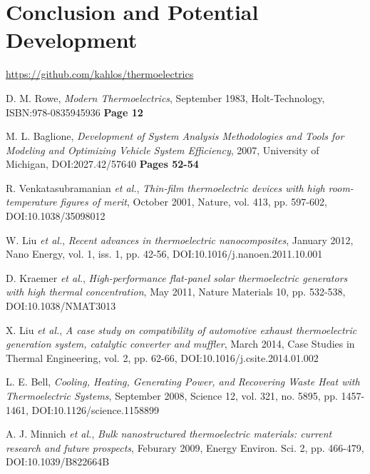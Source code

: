 \documentclass[12pt,draft]{article}
\begin{document}
\section{Conclusion and Potential Development}

\url{https://github.com/kahlos/thermoelectrics}

\begin{thebibliography}{11}

D. M. Rowe,
\emph{Modern Thermoelectrics},
September 1983,
Holt-Technology,
ISBN:978-0835945936
\textbf{Page 12}

M. L. Baglione,
\emph{Development of System Analysis Methodologies and Tools for Modeling and Optimizing Vehicle System Efficiency},
2007,
University of Michigan,
DOI:2027.42/57640
\textbf{Pages 52-54}

R. Venkatasubramanian \emph{et al.},
\emph{Thin-film thermoelectric devices with high room-temperature figures of merit},
October 2001,
Nature, vol. 413, pp. 597-602,
DOI:10.1038/35098012

W. Liu \emph{et al.},
\emph{Recent advances in thermoelectric nanocomposites},
January 2012,
Nano Energy, vol. 1, iss. 1, pp. 42-56,
DOI:10.1016/j.nanoen.2011.10.001

D. Kraemer \emph{et al.},
\emph{High-performance flat-panel solar thermoelectric
generators with high thermal concentration},
May 2011,
Nature Materials 10, pp. 532-538,
DOI:10.1038/NMAT3013

X. Liu \emph{et al.},
\emph{A case study on compatibility of automotive exhaust thermoelectric generation system, catalytic converter and muffler},
March 2014,
Case Studies in Thermal Engineering, vol. 2, pp. 62-66,
DOI:10.1016/j.csite.2014.01.002

L. E. Bell,
\emph{Cooling, Heating, Generating Power, and Recovering Waste Heat with Thermoelectric Systems},
September 2008,
Science 12, vol. 321, no. 5895, pp. 1457-1461,
DOI:10.1126/science.1158899

A. J. Minnich \emph{et al.},
\emph{Bulk nanostructured thermoelectric materials: current research and future prospects},
Feburary 2009,
Energy Environ. Sci. 2, pp. 466-479,
DOI:10.1039/B822664B


\end{thebibliography}
\end{document}
